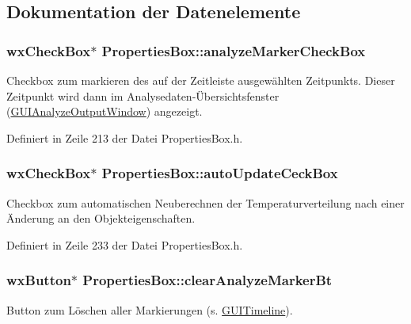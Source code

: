\subsection{Dokumentation der Datenelemente}
\hypertarget{classPropertiesBox_a20498b8540b84cc8f4e691aa57c7a7c3}{
\subsubsection[{analyze\-Marker\-Check\-Box}]{\setlength{\rightskip}{0pt plus 5cm}wx\-Check\-Box$\ast$ Properties\-Box\-::analyze\-Marker\-Check\-Box\hspace{0.3cm}{\ttfamily [private]}}}\label{classPropertiesBox_a20498b8540b84cc8f4e691aa57c7a7c3}
Checkbox zum markieren des auf der Zeitleiste ausgewählten Zeitpunkts. Dieser Zeitpunkt wird dann im Analysedaten-\/Übersichtsfenster (\hyperlink{classGUIAnalyzeOutputWindow}{G\-U\-I\-Analyze\-Output\-Window}) angezeigt. 

Definiert in Zeile 213 der Datei Properties\-Box.\-h.

\hypertarget{classPropertiesBox_aea93bc13aea5197dfe5d53f6c465c0ad}{
\subsubsection[{auto\-Update\-Ceck\-Box}]{\setlength{\rightskip}{0pt plus 5cm}wx\-Check\-Box$\ast$ Properties\-Box\-::auto\-Update\-Ceck\-Box\hspace{0.3cm}{\ttfamily [private]}}}\label{classPropertiesBox_aea93bc13aea5197dfe5d53f6c465c0ad}
Checkbox zum automatischen Neuberechnen der Temperaturverteilung nach einer Änderung an den Objekteigenschaften. 

Definiert in Zeile 233 der Datei Properties\-Box.\-h.

\hypertarget{classPropertiesBox_a93a88ce0e08aee33673b26ae63c7846f}{
\subsubsection[{clear\-Analyze\-Marker\-Bt}]{\setlength{\rightskip}{0pt plus 5cm}wx\-Button$\ast$ Properties\-Box\-::clear\-Analyze\-Marker\-Bt\hspace{0.3cm}{\ttfamily [private]}}}\label{classPropertiesBox_a93a88ce0e08aee33673b26ae63c7846f}
Button zum Löschen aller Markierungen (s. \hyperlink{classGUITimeline}{G\-U\-I\-Timeline}). 

